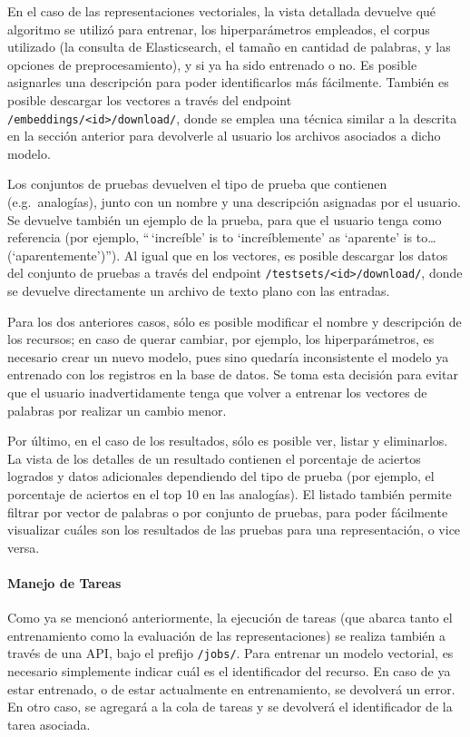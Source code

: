 En el caso de las representaciones vectoriales, la vista detallada devuelve qué algoritmo se utilizó
para entrenar, los hiperparámetros empleados, el corpus utilizado (la consulta de Elasticsearch, el
tamaño en cantidad de palabras, y las opciones de preprocesamiento), y si ya ha sido entrenado o
no. Es posible asignarles una descripción para poder identificarlos más fácilmente. También es
posible descargar los vectores a través del endpoint \texttt{/embeddings/<id>/download/}, donde se
emplea una técnica similar a la descrita en la sección anterior para devolverle al usuario los
archivos asociados a dicho modelo.

Los conjuntos de pruebas devuelven el tipo de prueba que contienen (e.g.\ analogías), junto con un
nombre y una descripción asignadas por el usuario. Se devuelve también un ejemplo de la prueba, para
que el usuario tenga como referencia (por ejemplo, ``\,`increíble' is to `increíblemente' as
`aparente' is to\ldots (`aparentemente')''). Al igual que en los vectores, es posible descargar los
datos del conjunto de pruebas a través del endpoint \texttt{/testsets/<id>/download/}, donde se
devuelve directamente un archivo de texto plano con las entradas.

Para los dos anteriores casos, sólo es posible modificar el nombre y descripción de los recursos; en
caso de querar cambiar, por ejemplo, los hiperparámetros, es necesario crear un nuevo modelo, pues
sino quedaría inconsistente el modelo ya entrenado con los registros en la base de datos. Se toma
esta decisión para evitar que el usuario inadvertidamente tenga que volver a entrenar los vectores
de palabras por realizar un cambio menor.

Por último, en el caso de los resultados, sólo es posible ver, listar y eliminarlos. La vista de los
detalles de un resultado contienen el porcentaje de aciertos logrados y datos adicionales
dependiendo del tipo de prueba (por ejemplo, el porcentaje de aciertos en el top 10 en las
analogías). El listado también permite filtrar por vector de palabras o por conjunto de pruebas,
para poder fácilmente visualizar cuáles son los resultados de las pruebas para una representación, o
vice versa.


\paragraph{Manejo de Tareas}

Como ya se mencionó anteriormente, la ejecución de tareas (que abarca tanto el entrenamiento como la
evaluación de las representaciones) se realiza también a través de una API, bajo el prefijo
\texttt{/jobs/}. Para entrenar un modelo vectorial, es necesario simplemente indicar cuál es el
identificador del recurso. En caso de ya estar entrenado, o de estar actualmente en entrenamiento,
se devolverá un error. En otro caso, se agregará a la cola de tareas y se devolverá el identificador
de la tarea asociada.

